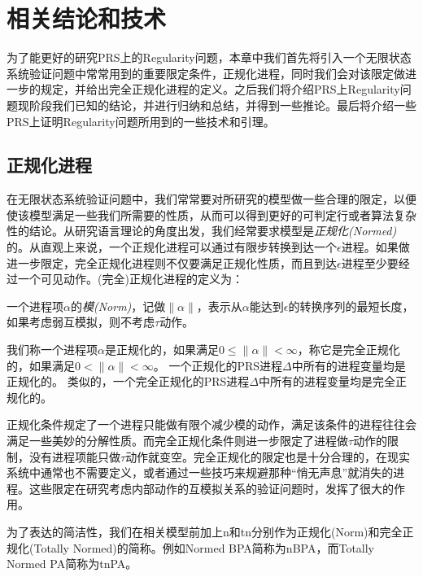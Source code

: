 
\chapter{相关结论和技术}
\label{chap:relat}

为了能更好的研究PRS上的Regularity问题，本章中我们首先将引入一个无限状态系统验证问题中常常用到的重要限定条件，正规化进程，同时我们会对该限定做进一步的规定，并给出完全正规化进程的定义。之后我们将介绍PRS上Regularity问题现阶段我们已知的结论，并进行归纳和总结，并得到一些推论。最后将介绍一些PRS上证明Regularity问题所用到的一些技术和引理。


\section{正规化进程}
\label{sec:norm}
 
在无限状态系统验证问题中，我们常常要对所研究的模型做一些合理的限定，以便使该模型满足一些我们所需要的性质，从而可以得到更好的可判定行或者算法复杂性的结论。从研究语言理论的角度出发，我们经常要求模型是\emph{正规化(Normed)}的。从直观上来说，一个正规化进程可以通过有限步转换到达一个$\epsilon$进程。如果做进一步限定，完全正规化进程则不仅要满足正规化性质，而且到达$\epsilon$进程至少要经过一个可见动作。(完全)正规化进程的定义为：

\begin{defn}\label{def:norm}
一个进程项$\alpha$的\emph{模(Norm)}，记做$\|\alpha\|$，表示从$\alpha$能达到$\epsilon$的转换序列的最短长度，如果考虑弱互模拟，则不考虑$\tau$动作。

我们称一个进程项$\alpha$是正规化的，如果满足$0\leq\|\alpha\|<\infty$，称它是完全正规化的，如果满足$0<\|\alpha\|<\infty$。
一个正规化的PRS进程$\Delta$中所有的进程变量均是正规化的。
类似的，一个完全正规化的PRS进程$\Delta$中所有的进程变量均是完全正规化的。
\end{defn}

正规化条件规定了一个进程只能做有限个减少模的动作，满足该条件的进程往往会满足一些美妙的分解性质。而完全正规化条件则进一步限定了进程做$\tau$动作的限制，没有进程项能只做$\tau$动作就变空。完全正规化的限定也是十分合理的，在现实系统中通常也不需要定义，或者通过一些技巧来规避那种``悄无声息''就消失的进程。这些限定在研究考虑内部动作的互模拟关系的验证问题时，发挥了很大的作用。

为了表达的简洁性，我们在相关模型前加上n和tn分别作为正规化(Norm)和完全正规化(Totally Normed)的简称。例如Normed BPA简称为nBPA，而Totally Normed PA简称为tnPA。


